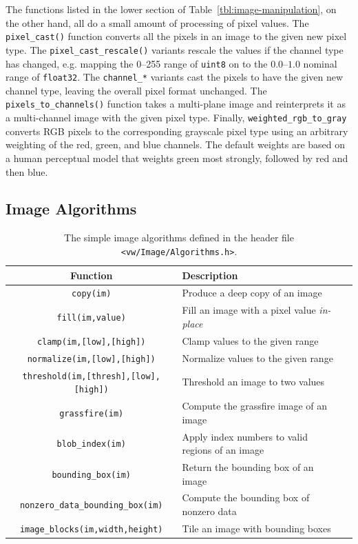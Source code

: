 The functions listed in the lower section of Table~\ref{tbl:image-manipulation},
on the other hand, all do a small amount of processing of pixel values.
The \verb#pixel_cast()# function converts all the pixels in an image to the
given new pixel type.  The \verb#pixel_cast_rescale()# variants rescale the
values if the channel type has changed, e.g. mapping the 0--255 range of
\verb#uint8# on to the $0.0$--$1.0$ nominal range of \verb#float32#.  The
\verb#channel_*# variants cast the pixels to have the given new channel type,
leaving the overall pixel format unchanged.  The \verb#pixels_to_channels()#
function takes a multi-plane image and reinterprets it as a multi-channel
image with the given pixel type.  Finally, \verb#weighted_rgb_to_gray# converts
RGB pixels to the corresponding grayscale pixel type using an arbitrary
weighting of the red, green, and blue channels.  The default weights are
based on a human perceptual model that weights green most strongly, followed
by red and then blue.

\subsection{Image Algorithms}

\begin{table}[t]\begin{centering}
\begin{tabular}{|c|l|l|} \hline
Function & Description \\ \hline \hline
\verb#copy(im)# & Produce a deep copy of an image \\ \hline
\verb#fill(im,value)# & Fill an image with a pixel value {\it in-place} \\ \hline
\verb#clamp(im,[low],[high])# & Clamp values to the given range \\ \hline
\verb#normalize(im,[low],[high])# & Normalize values to the given range \\ \hline
\verb#threshold(im,[thresh],[low],[high])# & Threshold an image to two values \\ \hline
\verb#grassfire(im)# & Compute the grassfire image of an image \\ \hline
\verb#blob_index(im)# & Apply index numbers to valid regions of an image \\ \hline
\verb#bounding_box(im)# & Return the bounding box of an image \\ \hline
\verb#nonzero_data_bounding_box(im)# & Compute the bounding box of nonzero data \\ \hline
\verb#image_blocks(im,width,height)# & Tile an image with bounding boxes \\ \hline
\end{tabular}
\caption{The simple image algorithms defined in the header file {\tt <vw/Image/Algorithms.h>}.}
\label{tbl:image-algorithms}
\end{centering}\end{table}

